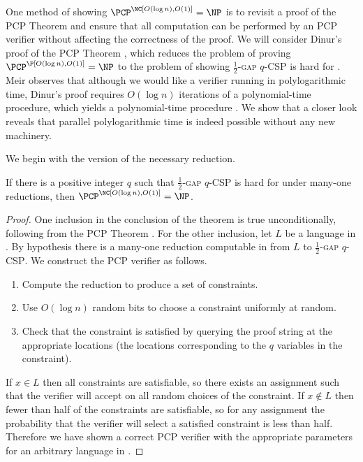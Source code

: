\documentclass{article}
\begin{document}
One method of showing $\PCP^\NC[O(\log n), O(1)] = \NP$ is to revisit a proof of the PCP Theorem and ensure that all computation can be performed by an \NC{} PCP verifier without affecting the correctness of the proof.
We will consider Dinur's proof of the PCP Theorem \autocite{dinur07}, which reduces the problem of proving $\PCP^\P[O(\log n), O(1)] = \NP$ to the problem of showing \textsc{$\frac{1}{2}$-gap $q$-CSP} is hard for \NP{}.
Meir observes that although we would like a verifier running in polylogarithmic time, Dinur's proof requires $O(\log n)$ iterations of a polynomial-time procedure, which yields a polynomial-time procedure \autocite[Section~1.2.1]{meir09}.
We show that a closer look reveals that parallel polylogarithmic time is indeed possible without any new machinery.

We begin with the \NC{} version of the necessary reduction.

\begin{lemma}\label{lem:inapprox}
  If there is a positive integer $q$ such that \textsc{$\frac{1}{2}$-gap $q$-CSP} is hard for \NP{} under \NC{} many-one reductions, then $\PCP^\NC[O(\log n), O(1)] = \NP$.
\end{lemma}
\begin{proof}
  One inclusion in the conclusion of the theorem is true unconditionally, following from the PCP Theorem \autocite{almss92}.
  For the other inclusion, let $L$ be a language in \NP{}.
  By hypothesis there is a many-one reduction computable in \NC{} from $L$ to \textsc{$\frac{1}{2}$-gap $q$-CSP}.
  We construct the PCP verifier as follows.
  \begin{enumerate}
  \item Compute the reduction to produce a set of constraints.
  \item Use $O(\log n)$ random bits to choose a constraint uniformly at random.
  \item Check that the constraint is satisfied by querying the proof string at the appropriate locations (the locations corresponding to the $q$ variables in the constraint).
  \end{enumerate}

  If $x \in L$ then all constraints are satisfiable, so there exists an assignment such that the verifier will accept on all random choices of the constraint.
  If $x \notin L$ then fewer than half of the constraints are satisfiable, so for any assignment the probability that the verifier will select a satisfied constraint is less than half.
  Therefore we have shown a correct PCP verifier with the appropriate parameters for an arbitrary language in \NP{}.
\end{proof}
\end{document}
